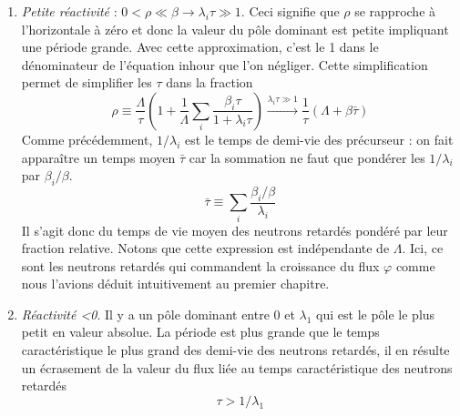 \begin{enumerate}
\item \textit{Petite réactivité} : $0<\rho\ll \beta \to \lambda_i\tau \gg 1$. Ceci signifie que 
$\rho$ se rapproche à l'horizontale à zéro et donc la valeur du pôle dominant est petite impliquant
une période grande.  Avec cette approximation, c'est le 1 dans le dénominateur de l'équation inhour 
que l'on négliger. Cette simplification permet de simplifier les $\tau$ dans la fraction
\begin{equation}
\rho  \equiv \frac{\Lambda }{\tau }\left(    1 + \frac{1}{\Lambda }\sum\limits_i    \frac{{{\beta _i}\tau }}{{1 + {\lambda _i}\tau }}    \right)\overset{\lambda_i\tau\gg1}{\longrightarrow}  \frac{1}{\tau }(\Lambda  + \beta \bar \tau )
\end{equation}
Comme précédemment, $1/\lambda_i$ est le temps de demi-vie des précurseur : on fait apparaître un 
temps moyen $\bar\tau$ car la sommation ne faut que pondérer les $1/\lambda_i$ par $\beta_i/\beta$.
\begin{equation}
\bar \tau  \equiv \sum\limits_i    \frac{{{\beta _i}/\beta }}{{{\lambda _i}}}
\end{equation}
Il s'agit donc du temps de vie moyen des neutrons retardés pondéré par leur fraction relative. Notons
que cette expression est indépendante de $\Lambda$. Ici, ce sont les neutrons retardés qui commandent
la croissance du flux $\varphi$ comme nous l'avions déduit intuitivement au premier chapitre. 

\item \textit{Réactivité <0}. Il y a un pôle dominant entre 0 et $\lambda_1$ qui est le pôle le plus
petit en valeur absolue. La période est plus grande que le temps caractéristique le plus grand des 
demi-vie des neutrons retardés, il en résulte un écrasement de la valeur du flux liée au temps 
caractéristique des neutrons retardés
\begin{equation}
\tau  > 1/{\lambda _1}
\end{equation}
\end{enumerate}


